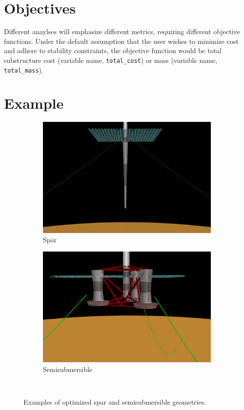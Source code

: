 \section{Objectives}
Different anaylses will emphasize different metrics, requiring different
objective functions.  Under the default assumption that the user wishes
to minimize cost and adhere to stability constraints, the objective
function would be total substructure cost (variable name,
\texttt{total\_cost}) or mass (variable name, \texttt{total\_mass}).

\section{Example}

\begin{figure}[htb]
  \begin{subfigure}[b]{0.49\linewidth}
    \centering \includegraphics[width=\linewidth]{figs/spar-optimal.pdf}
    \caption{Spar}
  \end{subfigure}
  \begin{subfigure}[b]{0.49\linewidth}
    \centering \includegraphics[width=\linewidth]{figs/semi-optimal.pdf}
    \caption{Semisubmersible}
  \end{subfigure}\\
  \caption{Examples of optimized spar and semisubmersible geometries.}
  \label{fig:optex}
\end{figure}

